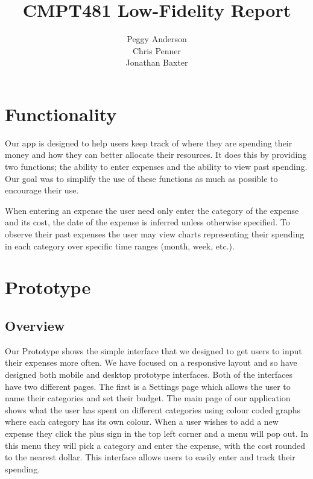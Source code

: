 \documentclass{chi2011}
\begin{document}
\setlength{\paperheight}{11in}
\setlength{\paperwidth}{8.5in}
\setlength{\pdfpageheight}{\paperheight}
\setlength{\pdfpagewidth}{\paperwidth}


\title{CMPT481 Low-Fidelity Report}
\author{
\alignauthor Peggy Anderson\\
    \alignauthor Chris Penner\\
    \alignauthor Jonathan Baxter\\
}


\maketitle

\section{Functionality}

Our app is designed to help users keep track of where they are spending their money and how they can better allocate
their resources. It does this by providing two functions; the ability to enter expenses and the ability to view past
spending. Our goal was to simplify the use of these functions as much as possible to encourage their use.

When entering an expense the user need only enter the category of the expense and its cost, the date of the expense is
inferred unless otherwise specified. To observe their past expenses the user may view charts representing their
spending in each category over specific time ranges (month, week, etc.).


\section{Prototype}
    \subsection{Overview}

    Our Prototype shows the simple interface that we designed to get users to
    input their expenses more often. We have focused on a responsive layout
    and so have designed both mobile and desktop prototype interfaces. Both
    of the interfaces have two different pages. The first is a Settings page
    which allows the user to name their categories and set their budget. The
    main page of our application shows what the user has spent on different
    categories using colour coded graphs where each category has its own
    colour. When a user wishes to add a new expense they click the plus sign in
    the top left corner and a menu will pop out. In this menu they will pick
    a category and enter the expense, with the cost rounded to the nearest
    dollar. This interface allows users to easily enter and track their
    spending.
\end{document}
